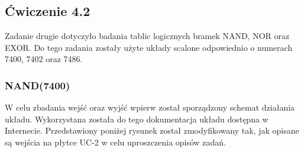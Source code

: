 \documentclass{article}
\begin{document}
    \subsection{Ćwiczenie 4.2}
      Zadanie drugie dotyczyło badania tablic logicznych bramek NAND, NOR oraz EXOR. Do tego zadania zostały użyte układy scalone odpowiednio o numerach 7400, 7402 oraz 7486.
      \subsubsection{NAND(7400)}
        W celu zbadania wejść oraz wyjść wpierw został sporządzony schemat działania układu. Wykorzystana została do tego dokumentacja układu dostępna w Internecie. Przedstawiony poniżej rysunek został zmodyfikowany tak, jak opisane są wejścia na płytce UC-2 w celu uproszczenia opisów zadań.
\end{document}
